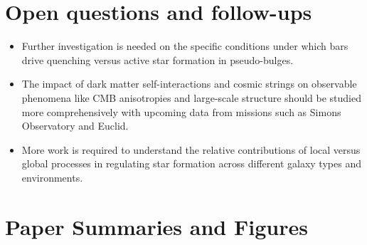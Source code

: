 \documentclass[11pt]{article}
\begin{document}
\section*{Open questions and follow-ups}
\begin{itemize}
\item Further investigation is needed on the specific conditions under which bars drive quenching versus active star formation in pseudo-bulges.
\item The impact of dark matter self-interactions and cosmic strings on observable phenomena like CMB anisotropies and large-scale structure should be studied more comprehensively with upcoming data from missions such as Simons Observatory and Euclid.
\item More work is required to understand the relative contributions of local versus global processes in regulating star formation across different galaxy types and environments.
\end{itemize}
\newpage
\section*{Paper Summaries and Figures}
\end{document}
